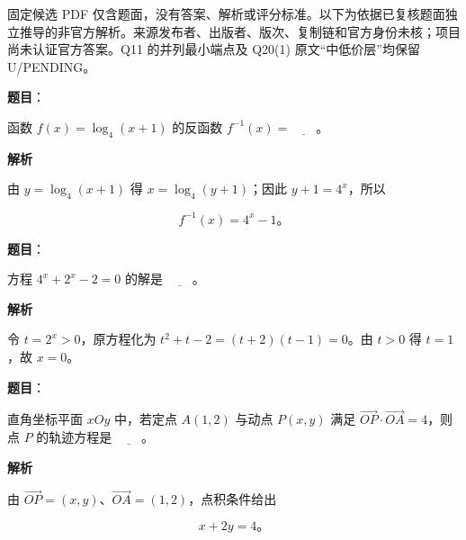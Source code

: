 

\begin{gktip}
固定候选 PDF 仅含题面，没有答案、解析或评分标准。以下为依据已复核题面独立推导的非官方解析。来源发布者、出版者、版次、复制链和官方身份未核；项目尚未认证官方答案。Q11 的并列最小端点及 Q20(1) 原文“中低价层”均保留 U/PENDING。
\end{gktip}

\begin{answer}

\textbf{题目}：

函数 $f(x)=\log_4(x+1)$ 的反函数 $f^{-1}(x)=\underline{\qquad}$。

\textbf{解析}

由 $y=\log_4(x+1)$ 得 $x=\log_4(y+1)$；因此 $y+1=4^x$，所以

\nopagebreak[4]
\[
f^{-1}(x)=4^x-1\mbox{。}
\]


\end{answer}
\begin{answer}

\textbf{题目}：

方程 $4^x+2^x-2=0$ 的解是 $\underline{\qquad}$。

\textbf{解析}

令 $t=2^x>0$，原方程化为 $t^2+t-2=(t+2)(t-1)=0$。由 $t>0$ 得 $t=1$，故 $x=0$。


\end{answer}
\begin{answer}

\textbf{题目}：

直角坐标平面 $xOy$ 中，若定点 $A(1,2)$ 与动点 $P(x,y)$ 满足 $\overrightarrow{OP}\cdot\overrightarrow{OA}=4$，则点 $P$ 的轨迹方程是 $\underline{\qquad}$。

\textbf{解析}

由 $\overrightarrow{OP}=(x,y)$、$\overrightarrow{OA}=(1,2)$，点积条件给出

\nopagebreak[4]
\[
x+2y=4\mbox{。}
\]


\end{answer}
